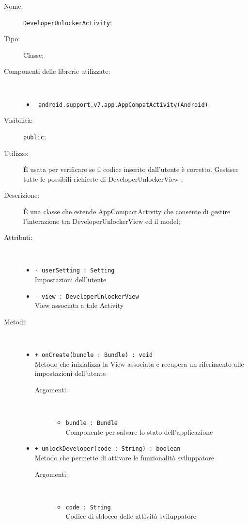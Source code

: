 \documentclass[../DefinizioneDiProdotto.tex]{subfiles}
\begin{document}
    \begin{description}
\item[Nome:] \texttt{DeveloperUnlockerActivity};
\item[Tipo:] Classe;
\item[Componenti delle librerie utilizzate:] \
\begin{itemize}
\item \texttt{ android.support.v7.app.AppCompatActivity(Android)}.

\end{itemize}
\item[Visibilità:] \texttt{public};
\item[Utilizzo:] È usata per verificare se il codice inserito dall'utente è corretto. Gestisce tutte le possibili richieste di DeveloperUnlockerView ;
\item[Descrizione:] È una classe che estende AppCompactActivity che consente di gestire l'interazione tra DeveloperUnlockerView ed il model;
\item[Attributi:] \
\begin{itemize}
\item \texttt{- userSetting : Setting}\\
Impostazioni dell'utente

\item \texttt{- view : DeveloperUnlockerView}\\
View associata a tale Activity

\end{itemize}
\item[Metodi:] \
\begin{itemize}
\item \texttt{+ onCreate(bundle : Bundle) : void}\\
Metodo che inizializza la View associata e recupera un riferimento alle impostazioni dell'utente
 \begin{description}
\item[Argomenti:] \
\begin{itemize}
\item \texttt{bundle : Bundle}\\
Componente per salvare lo stato dell'applicazione\end{itemize}
\end{description}
\item \texttt{+ unlockDeveloper(code : String) : boolean}\\
Metodo che permette di attivare le funzionalità sviluppatore
 \begin{description}
\item[Argomenti:] \
\begin{itemize}
\item \texttt{code : String}\\
Codice di sblocco delle attività sviluppatore\end{itemize}
\end{description}
\end{itemize}
\end{description}
\end{document}
